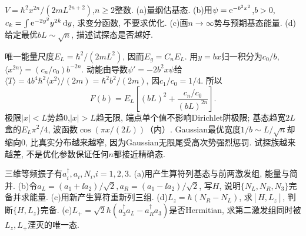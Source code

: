 \begin{exercise}
$V=\hbar^2x^{2n}/(2mL^{2n+2})$,$n\geq2$整数. (a)量纲估基态. (b)用$\psi=\mathrm e^{-b^2x^2}$,$b>0$, $c_k=\int\mathrm e^{-2y^2}y^{2k}\,\mathrm d y$, 求变分函数, 不要求优化. (c)画$n\to\infty$势与预期基态能量. (d)给定最优$bL\sim\sqrt n$, 描述试探态是否越好.
\end{exercise}
\begin{solution}
唯一能量尺度$E_L=\hbar^2/(2mL^2)$, 因而$E_g=C_nE_L$. 用$y=bx$归一积分为$c_0/b$, $\langle x^{2n}\rangle=(c_n/c_0)b^{-2n}$. 动能由导数$\psi'=-2b^2x\psi$给$\langle T\rangle=4b^4\hbar^2\langle x^2\rangle/(2m)=\hbar^2b^2/(2m)$, 因$c_1/c_0=1/4$. 所以
\[
F(b)=E_L\left[(bL)^2+\frac{c_n/c_0}{(bL)^{2n}}\right].
\]
极限$|x|<L$势趋0,$|x|>L$趋无限, 端点单个值不影响Dirichlet阱极限; 基态趋宽$2L$盒的$E_L\pi^2/4$, 波函数$\cos(\pi x/(2L))$（内）. Gaussian最优宽度$1/b\sim L/\sqrt n$却缩向0, 比真实分布越来越窄, 因为Gaussian无限尾受高次势强烈惩罚. 试探族越来越差, 不是优化参数保证任何$n$都接近精确态.
\begin{center}\end{center}
\end{solution}
\begin{exercise}
三维等频振子有$a_i^\dagger,a_i,N_i$,$i=1,2,3$. (a)用产生算符列基态与前两激发组, 能量与简并. (b)令$a_L=(a_1+\ii a_2)/\sqrt2,a_R=(a_1-\ii a_2)/\sqrt2$, 写$H$, 说明$\{N_L,N_R,N_3\}$完备并求能量. (c)用新产生算符重新列三组. (d)$L_z=\hbar(N_R-N_L)$, 求$[H,L_z]$, 判断$\{H,L_z\}$完备. (e)$L_+=\sqrt2\hbar(a_3^\dagger a_L-a_R^\dagger a_3)$是否Hermitian, 求第二激发组同时被$L_z,L_+$湮灭的唯一态.
\end{exercise}

